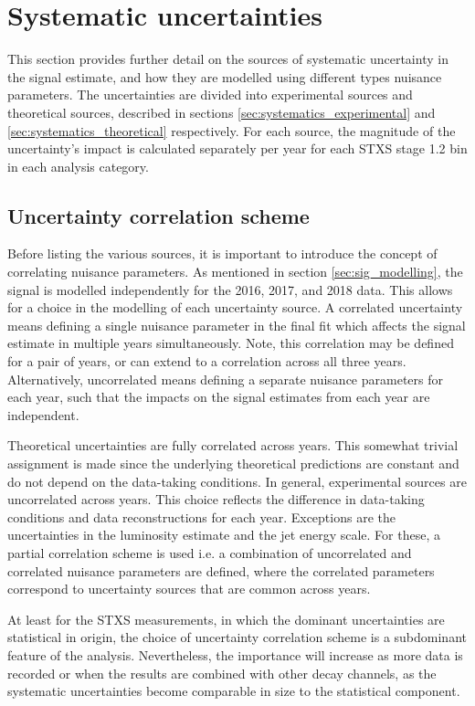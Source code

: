 \newpage
\section{Systematic uncertainties}\label{sec:systematics}
This section provides further detail on the sources of systematic uncertainty in the signal estimate, and how they are modelled using different types nuisance parameters. The uncertainties are divided into experimental sources and theoretical sources, described in sections \ref{sec:systematics_experimental} and \ref{sec:systematics_theoretical} respectively. For each source, the magnitude of the uncertainty's impact is calculated separately per year for each STXS stage 1.2 bin in each analysis category.

\subsection{Uncertainty correlation scheme}
Before listing the various sources, it is important to introduce the concept of correlating nuisance parameters. As mentioned in section \ref{sec:sig_modelling}, the signal is modelled independently for the 2016, 2017, and 2018 data. This allows for a choice in the modelling of each uncertainty source. A correlated uncertainty means defining a single nuisance parameter in the final fit which affects the signal estimate in multiple years simultaneously. Note, this correlation may be defined for a pair of years, or can extend to a correlation across all three years. Alternatively, uncorrelated means defining a separate nuisance parameters for each year, such that the impacts on the signal estimates from each year are independent. 

Theoretical uncertainties are fully correlated across years. This somewhat trivial assignment is made since the underlying theoretical predictions are constant and do not depend on the data-taking conditions. In general, experimental sources are uncorrelated across years. This choice reflects the difference in data-taking conditions and data reconstructions for each year. Exceptions are the uncertainties in the luminosity estimate and the jet energy scale. For these, a partial correlation scheme is used i.e. a combination of uncorrelated and correlated nuisance parameters are defined, where the correlated parameters correspond to uncertainty sources that are common across years.

At least for the STXS measurements, in which the dominant uncertainties are statistical in origin, the choice of uncertainty correlation scheme is a subdominant feature of the analysis. Nevertheless, the importance will increase as more data is recorded or when the results are combined with other decay channels, as the systematic uncertainties become comparable in size to the statistical component.

